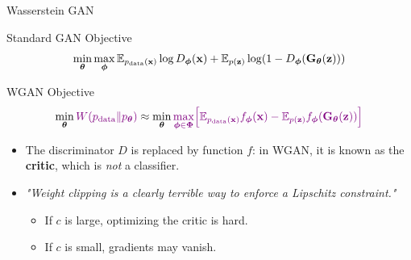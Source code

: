 \documentclass{beamer}
\renewcommand{\eqpause}{}
\begin{document}
\begin{frame}{Wasserstein GAN}
	\begin{block}{Standard GAN Objective}
		\vspace{-0.2cm}
		\[
			\min_{\boldsymbol{\theta}} \max_{\boldsymbol{\phi}} \mathbb{E}_{p_{\text{data}}(\mathbf{x})} \log D_{\boldsymbol{\phi}}(\mathbf{x}) + \mathbb{E}_{p(\mathbf{z})} \log (1 - D_{\boldsymbol{\phi}}(\mathbf{G}_{\boldsymbol{\theta}}(\mathbf{z})))
		\]
		\vspace{-0.3cm}
	\end{block}
	\begin{block}{WGAN Objective}
		\vspace{-0.3cm}
		\[
			\min_{\boldsymbol{\theta}} {\color{violet}W(p_{\text{data}} \| p_{\boldsymbol{\theta}})} \approx \min_{\boldsymbol{\theta}} {\color{violet}\max_{\boldsymbol{\phi} \in \boldsymbol{\Phi}} \Bigl[ \mathbb{E}_{p_{\text{data}}(\mathbf{x})} f_{\boldsymbol{\phi}}(\mathbf{x})  - \mathbb{E}_{p(\mathbf{z})} f_{\boldsymbol{\phi}}(\mathbf{G}_{\boldsymbol{\theta}}(\mathbf{z}))\Bigr]}
		\]
		\vspace{-0.3cm}
	\end{block}
	\eqpause
	\begin{itemize}
		\item The discriminator $D$ is replaced by function $f$: in WGAN, it is known as the \textbf{critic}, which is \emph{not} a classifier.
		\item \textit{"Weight clipping is a clearly terrible way to enforce a Lipschitz constraint."}
		\begin{itemize}
			\item If $c$ is large, optimizing the critic is hard.
			\item If $c$ is small, gradients may vanish.
		\end{itemize}
	\end{itemize}	
\end{frame}
\end{document}
